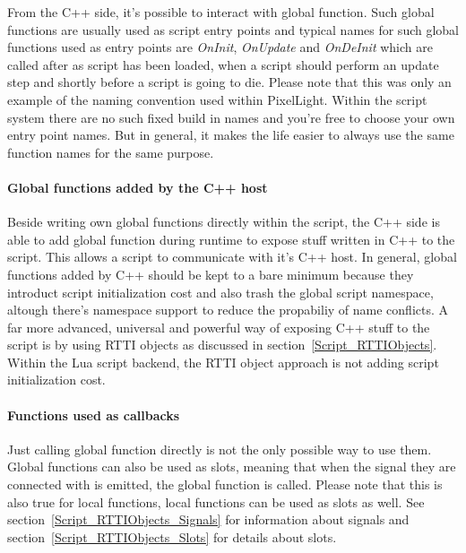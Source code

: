 From the C++ side, it's possible to interact with global function. Such global functions are usually used as script entry points and typical names for such global functions used as entry points are \emph{OnInit}, \emph{OnUpdate} and \emph{OnDeInit} which are called after as script has been loaded, when a script should perform an update step and shortly before a script is going to die. Please note that this was only an example of the naming convention used within PixelLight. Within the script system there are no such fixed build in names and you're free to choose your own entry point names. But in general, it makes the life easier to always use the same function names for the same purpose.


\paragraph{Global functions added by the C++ host}
Beside writing own global functions directly within the script, the C++ side is able to add global function during runtime to expose stuff written in C++ to the script. This allows a script to communicate with it's C++ host. In general, global functions added by C++ should be kept to a bare minimum because they introduct script initialization cost and also trash the global script namespace, altough there's namespace support to reduce the propabiliy of name conflicts. A far more advanced, universal and powerful way of exposing C++ stuff to the script is by using RTTI objects as discussed in section~\ref{Script_RTTIObjects}. Within the Lua script backend, the RTTI object approach is not adding script initialization cost.


\paragraph{Functions used as callbacks}
Just calling global function directly is not the only possible way to use them. Global functions can also be used as slots, meaning that when the signal they are connected with is emitted, the global function is called. Please note that this is also true for local functions, local functions can be used as slots as well. See section~\ref{Script_RTTIObjects_Signals} for information about signals and section~\ref{Script_RTTIObjects_Slots} for details about slots.

